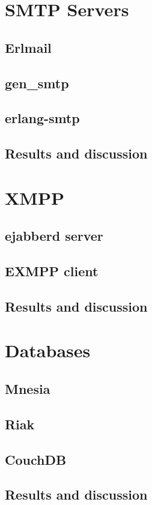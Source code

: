 \documentclass[11pt,a4paper]{report}
\begin{document}
\section{SMTP Servers}
\subsection{Erlmail}
\subsection{gen\_smtp}
\subsection{erlang-smtp}
\subsection{Results and discussion}

\section{XMPP}
\subsection{ejabberd server}
\subsection{EXMPP client}
\subsection{Results and discussion}

\section{Databases}
\subsection{Mnesia}
\subsection{Riak}
\subsection{CouchDB}
\subsection{Results and discussion}



\end{document}
